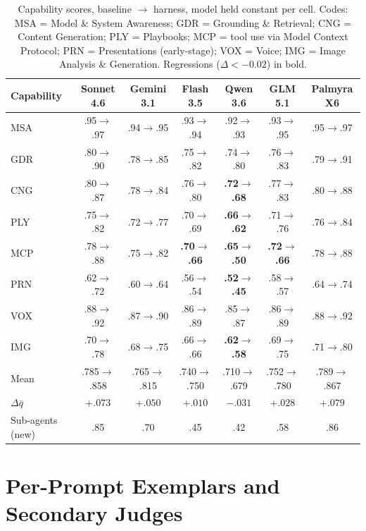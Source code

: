 \documentclass[11pt]{article}
\begin{document}
\begin{table}[h]
\centering\small
\caption{Capability scores, baseline $\rightarrow$ harness, model held constant per cell. Codes: MSA = Model \& System Awareness; GDR = Grounding \& Retrieval; CNG = Content Generation; PLY = Playbooks; MCP = tool use via Model Context Protocol; PRN = Presentations (early-stage); VOX = Voice; IMG = Image Analysis \& Generation. Regressions ($\Delta < -0.02$) in bold.}
\label{tab:matrix}
\setlength{\tabcolsep}{4.5pt}
\begin{tabular}{@{}lcccccc@{}}
\toprule
Capability & Sonnet 4.6 & Gemini 3.1 & Flash 3.5 & Qwen 3.6 & GLM 5.1 & Palmyra X6 \\
\midrule
MSA & .95$\to$.97 & .94$\to$.95 & .93$\to$.94 & .92$\to$.93 & .93$\to$.95 & .95$\to$.97 \\
GDR & .80$\to$.90 & .78$\to$.85 & .75$\to$.82 & .74$\to$.80 & .76$\to$.83 & .79$\to$.91 \\
CNG & .80$\to$.87 & .78$\to$.84 & .76$\to$.80 & \textbf{.72$\to$.68} & .77$\to$.83 & .80$\to$.88 \\
PLY & .75$\to$.82 & .72$\to$.77 & .70$\to$.69 & \textbf{.66$\to$.62} & .71$\to$.76 & .76$\to$.84 \\
MCP & .78$\to$.88 & .75$\to$.82 & \textbf{.70$\to$.66} & \textbf{.65$\to$.50} & \textbf{.72$\to$.66} & .78$\to$.88 \\
PRN & .62$\to$.72 & .60$\to$.64 & .56$\to$.54 & \textbf{.52$\to$.45} & .58$\to$.57 & .64$\to$.74 \\
VOX & .88$\to$.92 & .87$\to$.90 & .86$\to$.89 & .85$\to$.87 & .86$\to$.89 & .88$\to$.92 \\
IMG & .70$\to$.78 & .68$\to$.75 & .66$\to$.66 & \textbf{.62$\to$.58} & .69$\to$.75 & .71$\to$.80 \\
\midrule
Mean & .785$\to$.858 & .765$\to$.815 & .740$\to$.750 & .710$\to$.679 & .752$\to$.780 & .789$\to$.867 \\
$\Delta\bar q$ & $+.073$ & $+.050$ & $+.010$ & $-.031$ & $+.028$ & $+.079$ \\
\midrule
Sub-agents (new) & .85 & .70 & .45 & .42 & .58 & .86 \\
\bottomrule
\end{tabular}
\end{table}

\section{Per-Prompt Exemplars and Secondary Judges}
\label{app:prompts}
\end{document}

